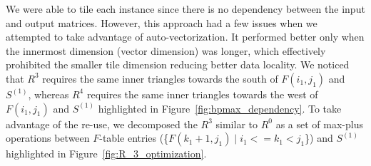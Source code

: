 We were able to tile each instance since there is no dependency between the input and output matrices. However, this approach had a few issues when we attempted to take advantage of auto-vectorization. It performed better only when the innermost dimension (vector dimension) was longer, which effectively prohibited the smaller tile dimension reducing better data locality. We noticed that $R^3$ requires the same inner triangles towards the south of $F(i_{1}, j_{1})$ and $S^{(1)}$, whereas $R^4$ requires the same inner triangles towards the west of $F(i_{1}, j_{1})$ and $S^{(1)}$ highlighted in Figure~\ref{fig:bpmax_dependency}. To take advantage of the re-use, we decomposed the $R^3$ similar to $R^0$ as a set of max-plus operations between $F$-table entries
(\{$F(k_{1}+1, j_{1}) \mid  i_{1} <=k_{1} < j_{1}$\}) 
and $S^{(1)}$ highlighted in Figure~\ref{fig:R_3_optimization}.
